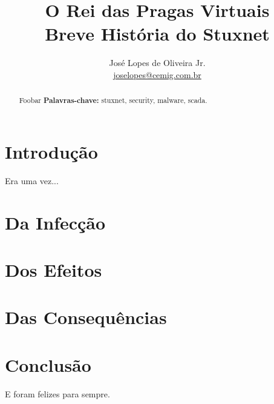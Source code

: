 \documentclass[12px,a4paper,twoside]{article}
\title{O Rei das Pragas Virtuais\\
{\small Breve História do Stuxnet}}
\author{José Lopes de Oliveira Jr. \\
{\small \href{mailto:joselopes@cemig.com.br}{joselopes@cemig.com.br}}}
\begin{document}
\maketitle

\begin{abstract}
\noindent Foobar
\newline\newline
\noindent \textbf{Palavras-chave:} stuxnet, security, malware, scada.
\end{abstract}


\section{Introdução}
\label{s:int}
Era uma vez...


\section{Da Infecção}
\section{Dos Efeitos}
\section{Das Consequências}


\section{Conclusão}
\label{s:con}
E foram felizes para sempre.




\end{document}
